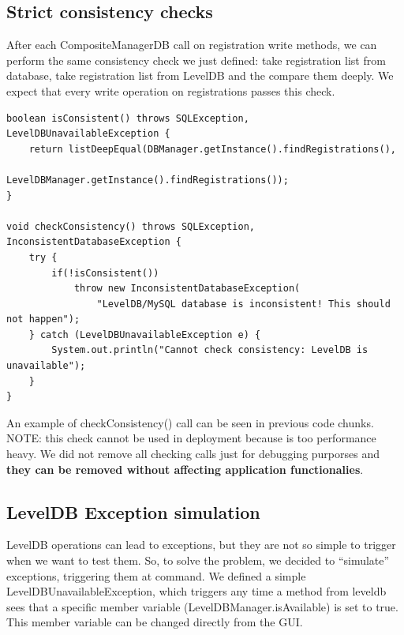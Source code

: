 \documentclass{report}
\begin{document}
\subsection*{Strict consistency checks}
After each CompositeManagerDB call on registration write methods, we can perform the same consistency check we just defined: take registration list from database, take registration list from LevelDB and the compare them deeply. We expect that every write operation on registrations passes this check.
\begin{lstlisting}
boolean isConsistent() throws SQLException, LevelDBUnavailableException {
	return listDeepEqual(DBManager.getInstance().findRegistrations(),
							LevelDBManager.getInstance().findRegistrations());
}

void checkConsistency() throws SQLException, InconsistentDatabaseException {
	try {
		if(!isConsistent())
			throw new InconsistentDatabaseException(
				"LevelDB/MySQL database is inconsistent! This should not happen");
	} catch (LevelDBUnavailableException e) {
		System.out.println("Cannot check consistency: LevelDB is unavailable");
	}
}
\end{lstlisting}
An example of checkConsistency() call can be seen in previous code chunks.\\
NOTE: this check cannot be used in deployment because is too performance heavy. We did not remove all checking calls just for debugging purporses and \textbf{they can be removed without affecting application functionalies}.

\subsection*{LevelDB Exception simulation}
LevelDB operations can lead to exceptions, but they are not so simple to trigger when we want to test them. So, to solve the problem, we decided to ``simulate'' exceptions, triggering them at command. We defined a simple LevelDBUnavailableException, which triggers any time a method from leveldb sees that a specific member variable (LevelDBManager.isAvailable) is set to true. This member variable can be changed directly from the GUI.


\end{document}
